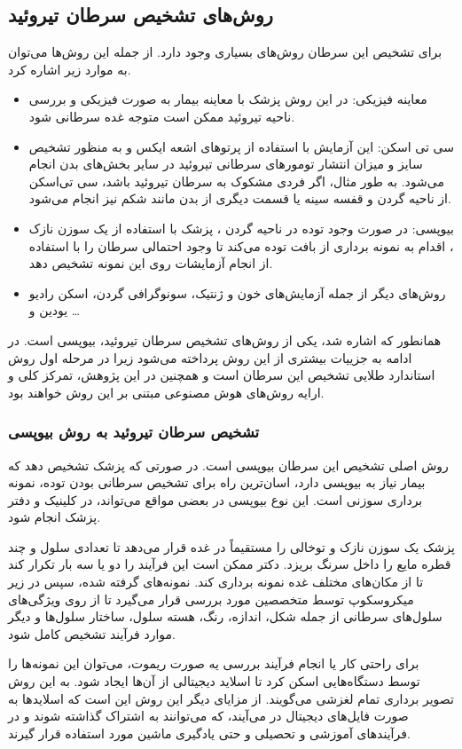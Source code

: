 \subsection{روش‌های تشخیص سرطان تیروئید}\label{subsec:روش-های-تشخیص-سرطان-تیروئید}

برای تشخیص این سرطان روش‌های بسیاری وجود دارد.
از جمله این روش‌ها می‌توان به موارد زیر اشاره کرد.

\begin{itemize}
    \item معاینه فیزیکی:
    در این روش پزشک با معاینه بیمار به صورت فیزیکی و بررسی ناحیه تیروئید ممکن است متوجه غده سرطانی شود.
    \item سی تی اسکن:
    این آزمایش با استفاده از پرتوهای اشعه ایکس و به منظور تشخیص سایز و میزان انتشار تومورهای سرطانی تیروئید در سایر بخش‌های بدن انجام می‌شود.
    به طور مثال، اگر فردی مشکوک به سرطان تیروئید باشد، سی تی‌اسکن از ناحیه گردن و قفسه سینه یا قسمت دیگری از بدن مانند شکم نیز انجام می‌شود.
    \item بیوپسی:
    در صورت وجود توده در ناحیه گردن ، پزشک با استفاده از يک سوزن نازک ، اقدام به نمونه برداری از بافت توده می‌کند تا وجود احتمالی سرطان را با استفاده از انجام آزمایشات روی این نمونه تشخیص دهد.
    \item روش‌های دیگر از جمله آزمایش‌های خون و ژنتیک، سونوگرافی گردن، اسکن رادیو یودین و \ldots
\end{itemize}

همانطور که اشاره شد، یکی از روش‌های تشخیص سرطان تیروئید، بیوپسی است.
در ادامه به جزییات بیشتری از این روش پرداخته می‌شود زیرا در مرحله اول روش استاندارد طلایی تشخیص این سرطان است و همچنین در این پژوهش، تمرکز کلی و ارایه روش‌های هوش مصنوعی مبتنی بر این روش خواهند بود.

\subsubsection{تشخیص سرطان تیروئید به روش بیوپسی}
روش اصلی تشخیص این سرطان بیوپسی است.
در صورتی که پزشک تشخیص دهد که بیمار نیاز به بیوپسی دارد، اسان‌ترین راه برای تشخیص سرطانی بودن توده،
نمونه برداری سوزنی است.
این نوع بیوپسی در بعضی مواقع می‌تواند، در کلینیک و دفتر پزشک انجام شود.

پزشک یک سوزن نازک و توخالی را مستقیماً در غده قرار می‌دهد تا تعدادی سلول و چند قطره مایع را داخل سرنگ بریزد.
دکتر ممکن است این فرآیند را دو یا سه بار تکرار کند تا از مکان‌های مختلف غده نمونه برداری کند.
نمونه‌های گرفته شده، سپس در زیر میکروسکوپ توسط متخصصین مورد بررسی قرار می‌گیرد تا از روی ویژگی‌های سلول‌های سرطانی از جمله شکل، اندازه، رنگ، هسته سلول، ساختار سلول‌ها و دیگر موارد فرآیند تشخیص کامل شود.

برای راحتی کار یا انجام فرآیند بررسی یه صورت ریموت، می‌توان این نمونه‌ها را توسط دستگاه‌هایی اسکن کرد تا اسلاید دیجیتالی از آن‌ها ایجاد شود.
به این روش تصویر برداری تمام لغزشی می‌گویند.
از مزایای دیگر این روش این است که اسلاید‌ها به صورت فایل‌های دیجیتال در می‌آیند، که می‌توانند به اشتراک گذاشته شوند و در فرآیند‌های آموزشی و تحصیلی و حتی یادگیری ماشین مورد استفاده قرار گیرند.

